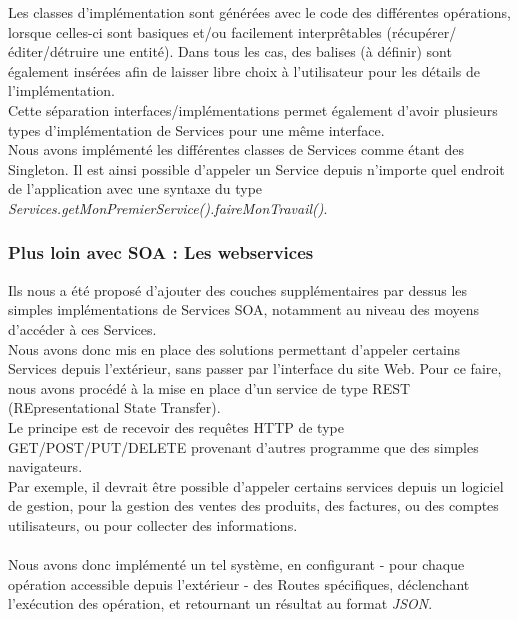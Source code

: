 Les classes d'implémentation sont générées avec le code des différentes opérations, lorsque celles-ci sont basiques et/ou facilement interprêtables (récupérer/éditer/détruire une entité). Dans tous les cas, des balises  (à définir) sont également insérées afin de laisser libre choix à l'utilisateur pour les détails de l'implémentation.\\
Cette séparation interfaces/implémentations permet également d'avoir plusieurs types d'implémentation de Services pour une même interface.\\
Nous avons implémenté les différentes classes de Services comme étant des Singleton. Il est ainsi possible d'appeler un Service depuis n'importe quel endroit de l'application avec une syntaxe du type \textit{Services.getMonPremierService().faireMonTravail()}.

\subsubsection{Plus loin avec SOA : Les webservices}

Ils nous a été proposé d'ajouter des couches supplémentaires par dessus les simples implémentations de Services SOA, notamment au niveau des moyens d'accéder à ces Services.\\
Nous avons donc mis en place des solutions permettant d'appeler certains Services depuis l'extérieur, sans passer par l'interface du site Web. Pour ce faire, nous avons procédé à la mise en place d'un service de type REST (REpresentational State Transfer).\\
Le principe est de recevoir des requêtes HTTP de type GET/POST/PUT/DELETE provenant d'autres programme que des simples navigateurs. \\
Par exemple, il devrait être possible d'appeler certains services depuis un logiciel de gestion, pour la gestion des ventes des produits, des factures, ou des comptes utilisateurs, ou pour collecter des informations.
\\\\
Nous avons donc implémenté un tel système, en configurant - pour chaque opération accessible depuis l'extérieur - des Routes spécifiques, déclenchant l'exécution des opération, et retournant un résultat au format \textit{JSON}.
